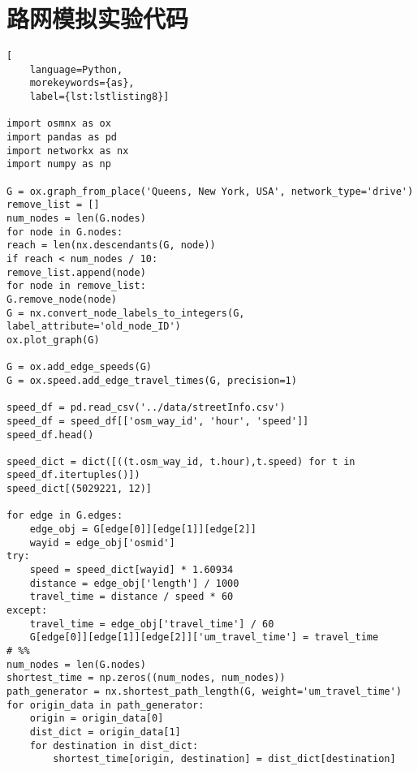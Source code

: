 \chapter{路网模拟实验代码}\label{ch:路网模拟实验代码}
\begin{lstlisting}[
    language=Python,
    morekeywords={as},
    label={lst:lstlisting8}]

import osmnx as ox
import pandas as pd
import networkx as nx
import numpy as np

G = ox.graph_from_place('Queens, New York, USA', network_type='drive')
remove_list = []
num_nodes = len(G.nodes)
for node in G.nodes:
reach = len(nx.descendants(G, node))
if reach < num_nodes / 10:
remove_list.append(node)
for node in remove_list:
G.remove_node(node)
G = nx.convert_node_labels_to_integers(G, label_attribute='old_node_ID')
ox.plot_graph(G)

G = ox.add_edge_speeds(G)
G = ox.speed.add_edge_travel_times(G, precision=1)

speed_df = pd.read_csv('../data/streetInfo.csv')
speed_df = speed_df[['osm_way_id', 'hour', 'speed']]
speed_df.head()

speed_dict = dict([((t.osm_way_id, t.hour),t.speed) for t in speed_df.itertuples()])
speed_dict[(5029221, 12)]

for edge in G.edges:
    edge_obj = G[edge[0]][edge[1]][edge[2]]
    wayid = edge_obj['osmid']
try:
    speed = speed_dict[wayid] * 1.60934
    distance = edge_obj['length'] / 1000
    travel_time = distance / speed * 60
except:
    travel_time = edge_obj['travel_time'] / 60
    G[edge[0]][edge[1]][edge[2]]['um_travel_time'] = travel_time
# %%
num_nodes = len(G.nodes)
shortest_time = np.zeros((num_nodes, num_nodes))
path_generator = nx.shortest_path_length(G, weight='um_travel_time')
for origin_data in path_generator:
    origin = origin_data[0]
    dist_dict = origin_data[1]
    for destination in dist_dict:
        shortest_time[origin, destination] = dist_dict[destination]
\end{lstlisting}



